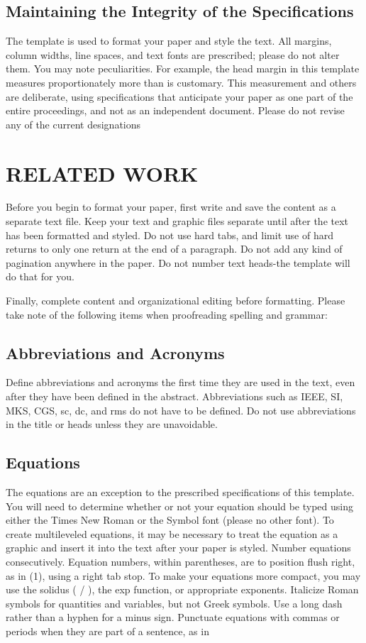 \documentclass[a4paper, 10pt, conference]{ieeeconf}      %
\begin{document}
\subsection{Maintaining the Integrity of the Specifications}

The template is used to format your paper and style the text. All margins, column widths, line spaces, and text fonts are prescribed; please do not alter them. You may note peculiarities. For example, the head margin in this template measures proportionately more than is customary. This measurement and others are deliberate, using specifications that anticipate your paper as one part of the entire proceedings, and not as an independent document. Please do not revise any of the current designations

\section{RELATED WORK}

Before you begin to format your paper, first write and save the content as a separate text file. Keep your text and graphic files separate until after the text has been formatted and styled. Do not use hard tabs, and limit use of hard returns to only one return at the end of a paragraph. Do not add any kind of pagination anywhere in the paper. Do not number text heads-the template will do that for you.

Finally, complete content and organizational editing before formatting. Please take note of the following items when proofreading spelling and grammar:

\subsection{Abbreviations and Acronyms} Define abbreviations and acronyms the first time they are used in the text, even after they have been defined in the abstract. Abbreviations such as IEEE, SI, MKS, CGS, sc, dc, and rms do not have to be defined. Do not use abbreviations in the title or heads unless they are unavoidable.

\subsection{Equations}
The equations are an exception to the prescribed specifications of this template. You will need to determine whether or not your equation should be typed using either the Times New Roman or the Symbol font (please no other font). To create multileveled equations, it may be necessary to treat the equation as a graphic and insert it into the text after your paper is styled. Number equations consecutively. Equation numbers, within parentheses, are to position flush right, as in (1), using a right tab stop. To make your equations more compact, you may use the solidus ( / ), the exp function, or appropriate exponents. Italicize Roman symbols for quantities and variables, but not Greek symbols. Use a long dash rather than a hyphen for a minus sign. Punctuate equations with commas or periods when they are part of a sentence, as in
\end{document}
